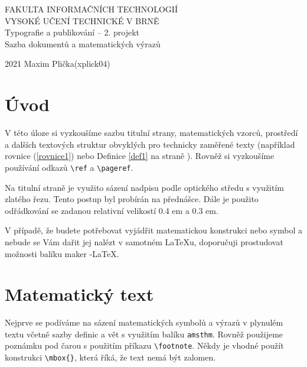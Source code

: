 \documentclass[a4paper,twocolumn,11pt]{article}
\begin{document}
\begin{titlepage}
\begin{center}
\Huge
\textsc{FAKULTA INFORMAČNÍCH TECHNOLOGIÍ\\
VYSOKÉ UČENÍ TECHNICKÉ V BRNĚ
}
\\
\LARGE
Typografie a publikování – 2. projekt\\
Sazba dokumentů a matematických výrazů
\end{center}
{\LARGE 2021 \hfill
Maxim Plička(xplick04)}

\end{titlepage}
\section*{Úvod}
V této úloze si vyzkoušíme sazbu titulní strany, matematických vzorců, 
prostředí a dalších textových struktur 
obvyklých pro technicky zaměřené texty (například rovnice (\ref{rovnice1})
nebo Definice \ref{def1} na straně \pageref{def1}). Rovněž si vyzkoušíme používání odkazů \verb!\ref! a \verb!\pageref!.

Na titulní straně je využito sázení nadpisu podle optického středu s využitím zlatého řezu.
Tento postup byl probírán na přednášce. Dále je použito odřádkování se
zadanou relativní velikostí 0.4 em a 0.3 em.

V případě, že budete potřebovat vyjádřit matematickou
konstrukci nebo symbol a nebude se Vám dařit jej nalézt
v samotném \LaTeX u, doporučuji prostudovat možnosti balíku maker \AmS-\LaTeX.

\section{Matematický text}
Nejprve se podíváme na sázení matematických symbolů
a výrazů v plynulém textu včetně sazby definic a vět s využitím balíku \texttt{amsthm}. Rovněž použijeme poznámku pod
čarou s použitím příkazu \verb!\footnote!. Někdy je vhodné
použít konstrukci \verb!\mbox{}!, která říká, že text nemá být
zalomen.
\end{document}

